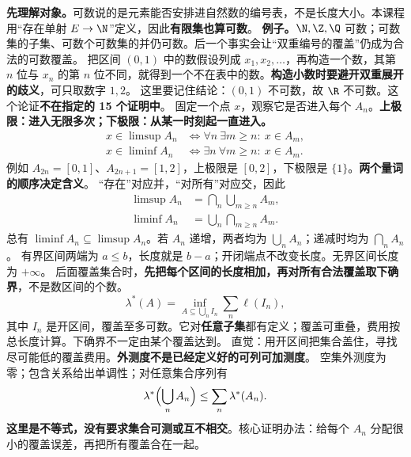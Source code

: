 \textbf{先理解对象。}可数说的是元素能否安排进自然数的编号表，不是长度大小。本课程用“存在单射 $E\to\N$”定义，因此\textbf{有限集也算可数}。
\textbf{例子。}$\N,\Z,\Q$ 可数；可数集的子集、可数个可数集的并仍可数。后一个事实会让“双重编号的覆盖”仍成为合法的可数覆盖。
把区间 $(0,1)$ 中的数假设列成 $x_1,x_2,\ldots$，再构造一个数，其第 $n$ 位与 $x_n$ 的第 $n$ 位不同，就得到一个不在表中的数。\textbf{构造小数时要避开双重展开的歧义}，可只取数字 $1,2$。
这里要记住结论：$(0,1)$ 不可数，故 $\R$ 不可数。这个论证\textbf{不在指定的 15 个证明中}。
固定一个点 $x$，观察它是否进入每个 $A_n$。\textbf{上极限：进入无限多次；下极限：从某一时刻起一直进入。}
\[
\begin{aligned}
x\in\limsup A_n&\iff\forall n\ \exists m\ge n:\ x\in A_m,\\
x\in\liminf A_n&\iff\exists n\ \forall m\ge n:\ x\in A_m.
\end{aligned}
\]
例如 $A_{2n}=[0,1]$、$A_{2n+1}=[1,2]$，上极限是 $[0,2]$，下极限是 $\{1\}$。\textbf{两个量词的顺序决定含义}。
“存在”对应并，“对所有”对应交，因此
\[
\begin{aligned}
\limsup A_n&=\bigcap_n\bigcup_{m\ge n}A_m,\\
\liminf A_n&=\bigcup_n\bigcap_{m\ge n}A_m.
\end{aligned}
\]
总有 $\liminf A_n\subseteq\limsup A_n$。若 $A_n$ 递增，两者均为 $\bigcup_n A_n$；递减时均为 $\bigcap_n A_n$。
有界区间两端为 $a\le b$，长度就是 $b-a$；开闭端点不改变长度。无界区间长度为 $+\infty$。
后面覆盖集合时，\textbf{先把每个区间的长度相加，再对所有合法覆盖取下确界}，不是数区间的个数。
\[
\lambda^*(A)=\inf_{A\subseteq\bigcup_n I_n}\sum_n\ell(I_n),
\]
其中 $I_n$ 是开区间，覆盖至多可数。它对\textbf{任意子集}都有定义；覆盖可重叠，费用按总长度计算。下确界不一定由某个覆盖达到。
直觉：用开区间把集合盖住，寻找尽可能低的覆盖费用。\textbf{外测度不是已经定义好的可列可加测度}。
空集外测度为零；包含关系给出单调性；对任意集合序列有
\[
\lambda^*\Bigl(\bigcup_n A_n\Bigr)\le\sum_n\lambda^*(A_n).
\]
\textbf{这里是不等式，没有要求集合可测或互不相交}。核心证明办法：给每个 $A_n$ 分配很小的覆盖误差，再把所有覆盖合在一起。
